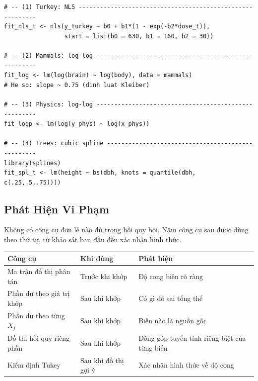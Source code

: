 \documentclass[12pt, a4paper]{article}
\begin{document}
\begin{lstlisting}[style=Rstyle]
# -- (1) Turkey: NLS ----------------------------------------------------------
fit_nls_t <- nls(y_turkey ~ b0 + b1*(1 - exp(-b2*dose_t)),
                 start = list(b0 = 630, b1 = 160, b2 = 30))

# -- (2) Mammals: log-log -----------------------------------------------------
fit_log <- lm(log(brain) ~ log(body), data = mammals)
# He so: slope ~ 0.75 (dinh luat Kleiber)

# -- (3) Physics: log-log -----------------------------------------------------
fit_logp <- lm(log(y_phys) ~ log(x_phys))

# -- (4) Trees: cubic spline --------------------------------------------------
library(splines)
fit_spl_t <- lm(height ~ bs(dbh, knots = quantile(dbh, c(.25,.5,.75))))
\end{lstlisting}

\subsection{Phát Hiện Vi Phạm}

Không có công cụ đơn lẻ nào đủ trong hồi quy bội. Năm công cụ sau được dùng theo thứ tự, từ khảo sát ban đầu đến xác nhận hình thức.

\begin{center}
\begin{tabular}{@{}llp{6.2cm}@{}}
\toprule
\textbf{Công cụ} & \textbf{Khi dùng} & \textbf{Phát hiện} \\
\midrule
Ma trận đồ thị phân tán   & Trước khi khớp  & Độ cong biên rõ ràng \\
Phần dư theo giá trị khớp & Sau khi khớp    & Có gì đó sai tổng thể \\
Phần dư theo từng $X_j$   & Sau khi khớp    & Biến nào là nguồn gốc \\
Đồ thị hồi quy riêng phần & Sau khi khớp    & Đóng góp tuyến tính riêng biệt của từng biến \\
Kiểm định Tukey            & Sau khi đồ thị gợi ý & Xác nhận hình thức về độ cong \\
\bottomrule
\end{tabular}
\end{center}

\end{document}
